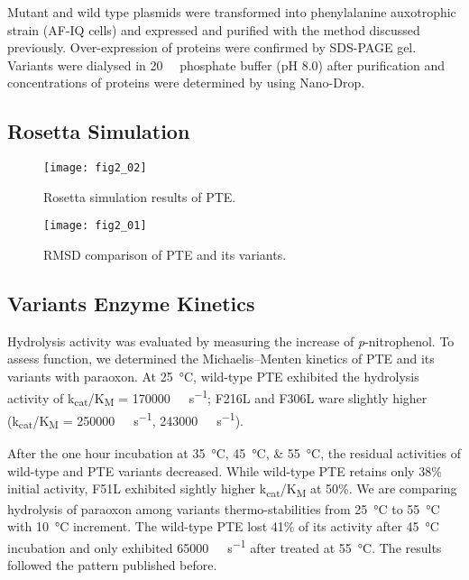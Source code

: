 \begin{refsection}
Mutant and wild type plasmids were transformed into  phenylalanine
auxotrophic strain (AF-IQ cells) and expressed and purified with the method
discussed  previously.\cite{Yang2014a} Over-expression of proteins were
confirmed by SDS-PAGE gel. Variants were dialysed in \SI{20}{\milli\Molar}
phosphate buffer (pH 8.0) after purification and concentrations of proteins
were determined by using Nano-Drop.

\subsection{Rosetta Simulation}

\begin{figure}[h!] \centering \texttt{[image: fig2\_02]}
    \caption[Rosetta simulation results of PTE.]{Rosetta simulation results of PTE.}
    \label{fig:rosetta-pte-chap2}
\end{figure}
\begin{figure}[h!] \centering \texttt{[image: fig2\_01]}
    \caption[RMSD comparison of PTE and its variants.]{RMSD comparison of PTE
    and its variants.} 
    \label{fig:rmsd-pte-chap2}
\end{figure}

\subsection{Variants Enzyme Kinetics}

Hydrolysis activity was evaluated by measuring the increase of
\emph{p}-nitrophenol. To assess function, we determined the Michaelis–Menten
kinetics of PTE and its variants with paraoxon. At \SI{25}{\celsius},
wild-type PTE exhibited the hydrolysis activity of
k\textsubscript{cat}/K\textsubscript{M} = \SI{170000}{\per\Molar\per\second};
F216L and F306L ware slightly higher (k\textsubscript{cat}/K\textsubscript{M} =
\SI{250000}{\per\Molar\per\second}, \SI{243000}{\per\Molar\per\second}). 

After the one hour incubation at \SIlist{35;45;55}{\celsius}, the residual
activities of wild-type and PTE variants decreased. While wild-type PTE retains
only 38\% initial activity, F51L exhibited sightly higher
k\textsubscript{cat}/K\textsubscript{M} at 50\%. We are comparing hydrolysis of
paraoxon among variants thermo-stabilities from \SI{25}{\celsius} to
\SI{55}{\celsius} with \SI{10}{\celsius} increment. The wild-type PTE lost 41\%
of its activity after \SI{45}{\celsius} incubation and only exhibited
\SI{65000}{\per\Molar\per\second} after treated at \SI{55}{\celsius}. The
results followed the pattern published before.\cite{Yang2014a} 


\end{refsection}
